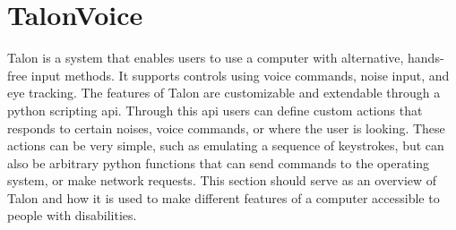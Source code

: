\documentclass[a4paper,english]{ifimaster}
\begin{document}





\section{TalonVoice}
Talon is a system that enables users to use a computer with alternative, hands-free input methods.
It supports controls using voice commands, noise input, and eye tracking.
The features of Talon are customizable and extendable through a python scripting api.
Through this api users can define custom actions that responds to certain noises, voice commands, or where the user is looking.
These actions can be very simple, such as emulating a sequence of keystrokes, but can also be arbitrary python functions
that can send commands to the operating system, or make network requests.
This section should serve as an overview of Talon and how it is used to make different features of a computer accessible to people with disabilities.
\end{document}

